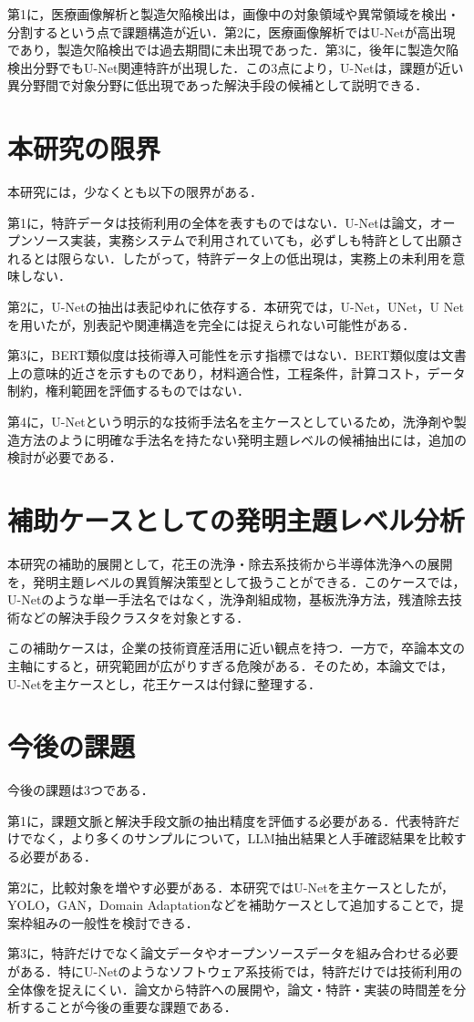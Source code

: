 第1に，医療画像解析と製造欠陥検出は，画像中の対象領域や異常領域を検出・分割するという点で課題構造が近い．第2に，医療画像解析ではU-Netが高出現であり，製造欠陥検出では過去期間に未出現であった．第3に，後年に製造欠陥検出分野でもU-Net関連特許が出現した．この3点により，U-Netは，課題が近い異分野間で対象分野に低出現であった解決手段の候補として説明できる．

\section{本研究の限界}
本研究には，少なくとも以下の限界がある．

第1に，特許データは技術利用の全体を表すものではない．U-Netは論文，オープンソース実装，実務システムで利用されていても，必ずしも特許として出願されるとは限らない．したがって，特許データ上の低出現は，実務上の未利用を意味しない．

第2に，U-Netの抽出は表記ゆれに依存する．本研究では，U-Net，UNet，U Netを用いたが，別表記や関連構造を完全には捉えられない可能性がある．

第3に，BERT類似度は技術導入可能性を示す指標ではない．BERT類似度は文書上の意味的近さを示すものであり，材料適合性，工程条件，計算コスト，データ制約，権利範囲を評価するものではない．

第4に，U-Netという明示的な技術手法名を主ケースとしているため，洗浄剤や製造方法のように明確な手法名を持たない発明主題レベルの候補抽出には，追加の検討が必要である．

\section{補助ケースとしての発明主題レベル分析}
本研究の補助的展開として，花王の洗浄・除去系技術から半導体洗浄への展開を，発明主題レベルの異質解決策型として扱うことができる．このケースでは，U-Netのような単一手法名ではなく，洗浄剤組成物，基板洗浄方法，残渣除去技術などの解決手段クラスタを対象とする．

この補助ケースは，企業の技術資産活用に近い観点を持つ．一方で，卒論本文の主軸にすると，研究範囲が広がりすぎる危険がある．そのため，本論文では，U-Netを主ケースとし，花王ケースは付録に整理する．

\section{今後の課題}
今後の課題は3つである．

第1に，課題文脈と解決手段文脈の抽出精度を評価する必要がある．代表特許だけでなく，より多くのサンプルについて，LLM抽出結果と人手確認結果を比較する必要がある．

第2に，比較対象を増やす必要がある．本研究ではU-Netを主ケースとしたが，YOLO，GAN，Domain Adaptationなどを補助ケースとして追加することで，提案枠組みの一般性を検討できる．

第3に，特許だけでなく論文データやオープンソースデータを組み合わせる必要がある．特にU-Netのようなソフトウェア系技術では，特許だけでは技術利用の全体像を捉えにくい．論文から特許への展開や，論文・特許・実装の時間差を分析することが今後の重要な課題である．
